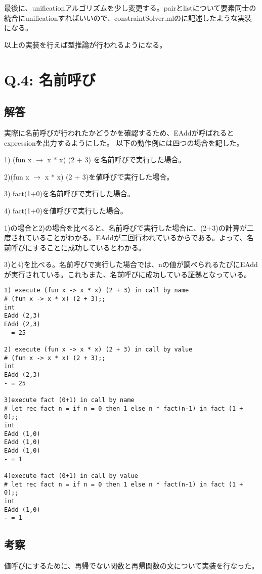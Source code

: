 \documentclass[uplatex,12pt]{jsarticle}
\begin{document}
最後に、unificationアルゴリズムを少し変更する。pairとlistについて要素同士の統合にunificationすればいいので、constraintSolver.mlのに記述したような実装になる。

以上の実装を行えば型推論が行われるようになる。






\section{Q.4: 名前呼び}
\subsection{解答}
実際に名前呼びが行われたかどうかを確認するため、EAddが呼ばれるとexpressionを出力するようにした。
以下の動作例には四つの場合を記した。

1) (fun x $\rightarrow$ x * x) (2 + 3) を名前呼びで実行した場合。

2)(fun x $\rightarrow$ x * x) (2 + 3)を値呼びで実行した場合。

3) fact(1+0)を名前呼びで実行した場合。

4) fact(1+0)を値呼びで実行した場合。

1)の場合と2)の場合を比べると、名前呼びで実行した場合に、(2+3)の計算が二度されていることがわかる。EAddが二回行われているからである。よって、名前呼びにすることに成功しているとわかる。

3)と4)を比べる。名前呼びで実行した場合では、nの値が調べられるたびにEAddが実行されている。これもまた、名前呼びに成功している証拠となっている。


\begin{lstlisting}[caption=動作例]
1) execute (fun x -> x * x) (2 + 3) in call by name
# (fun x -> x * x) (2 + 3);;
int
EAdd (2,3)
EAdd (2,3)
- = 25

2) execute (fun x -> x * x) (2 + 3) in call by value
# (fun x -> x * x) (2 + 3);;
int
EAdd (2,3)
- = 25

3)execute fact (0+1) in call by name
# let rec fact n = if n = 0 then 1 else n * fact(n-1) in fact (1 + 0);;
int
EAdd (1,0)
EAdd (1,0)
EAdd (1,0)
- = 1

4)execute fact (0+1) in call by value
# let rec fact n = if n = 0 then 1 else n * fact(n-1) in fact (1 + 0);;
int
EAdd (1,0)
- = 1

\end{lstlisting}

\subsection{考察}
値呼びにするために、再帰でない関数と再帰関数の文について実装を行なった。
\end{document}
